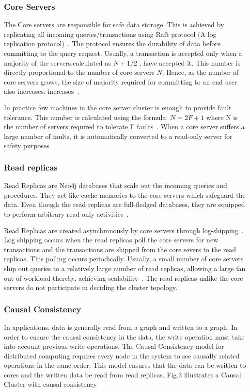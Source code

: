 \documentclass[9pt,twocolumn,twoside]{../../styles/osajnl}
\begin{document}
\subsubsection{Core Servers}
The Core servers are responsible for safe data storage. This is achieved by replicating all incoming queries/transactions using Raft protocol (A log replication protocol)~\cite{www-neo4j-causal}. The protocol ensures the durability of data before committing to the query request. Usually, a transaction is accepted only when a majority of the servers,calculated as $N+1/2$ , have accepted it. This number is directly proportional to the number of core servers $N$. Hence, as the number of core servers grows, the size of majority required for committing to an end user also increases. increases~\cite{www-neo4j-causal}. 

In practice few machines in the core server cluster is enough to provide fault tolerance. This number is calculated using the formula: $N = 2F +1 $ where N is the number of servers required to tolerate F faults~\cite{www-neo4j-causal}. When a core server suffers a large number of faults, it is automatically converted to a read-only server for safety purposes. 

\subsubsection{Read replicas}
Read Replicas are Neo4j databases that scale out the incoming queries and procedures. They act like cache memories to the core servers which safeguard the data. Even though the read replicas are full-fledged databases, they are equipped to perform arbitrary read-only activities~\cite{www-neo4j-causal}.

Read Replicas are created asynchronously by core servers through log-shipping~\cite{www-neo4j-causal}. Log shipping occurs when the read replicas poll the core servers for new transactions and the transactions are shipped from the core severs to the read replicas. This polling occurs periodically. Usually, a small number of core servers ship out queries to a relatively large number of read replicas, allowing a large fan out of workload thereby, achieving scalability~\cite{www-neo4j-causal}. The read replicas unlike the core servers do not participate in deciding the cluster topology. 

\subsubsection{Causal Consistency}
In applications, data is generally read from a graph and written to a graph. In order to ensure the causal consistency in the data, the write operation must take into account previous write operations. The Causal Consistency model for distributed computing requires every node in the system to see causally related operations in the same order. This model ensures that the data can be written to cores and the written data be read from read replicas.
Fig.3 illustrates a Causal Cluster with causal consistency
\end{document}
